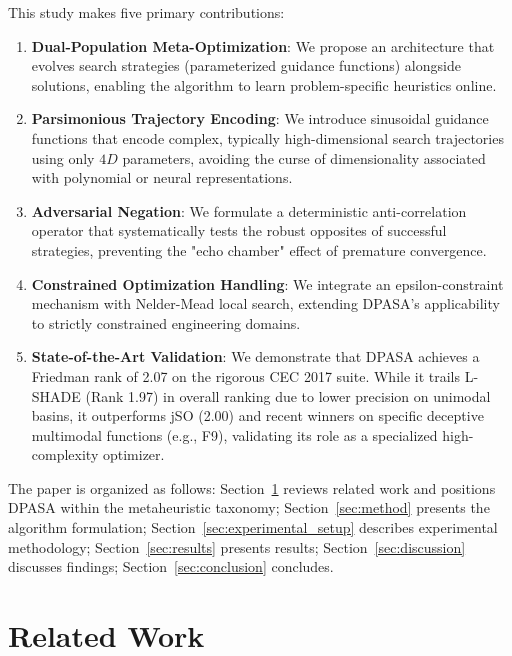 \documentclass[11pt]{article}
\begin{document}
This study makes five primary contributions:
\begin{enumerate}
    \item \textbf{Dual-Population Meta-Optimization}: We propose an architecture that evolves search strategies (parameterized guidance functions) alongside solutions, enabling the algorithm to learn problem-specific heuristics online.
    \item \textbf{Parsimonious Trajectory Encoding}: We introduce sinusoidal guidance functions that encode complex, typically high-dimensional search trajectories using only $4D$ parameters, avoiding the curse of dimensionality associated with polynomial or neural representations.
    \item \textbf{Adversarial Negation}: We formulate a deterministic anti-correlation operator that systematically tests the robust opposites of successful strategies, preventing the "echo chamber" effect of premature convergence.
    \item \textbf{Constrained Optimization Handling}: We integrate an epsilon-constraint mechanism with Nelder-Mead local search, extending DPASA's applicability to strictly constrained engineering domains.
    \item \textbf{State-of-the-Art Validation}: We demonstrate that DPASA achieves a Friedman rank of 2.07 on the rigorous CEC 2017 suite. While it trails L-SHADE (Rank 1.97) in overall ranking due to lower precision on unimodal basins, it outperforms jSO (2.00) and recent winners on specific deceptive multimodal functions (e.g., F9), validating its role as a specialized high-complexity optimizer.
\end{enumerate}

The paper is organized as follows: Section~\ref{sec:related} reviews related work and positions DPASA within the metaheuristic taxonomy; Section~\ref{sec:method} presents the algorithm formulation; Section~\ref{sec:experimental_setup} describes experimental methodology; Section~\ref{sec:results} presents results; Section~\ref{sec:discussion} discusses findings; Section~\ref{sec:conclusion} concludes.

\section{Related Work}
\label{sec:related}
\end{document}
